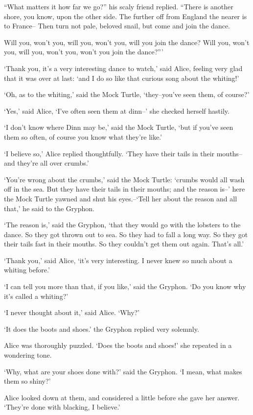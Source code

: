 \documentclass[statementpaper,twoside,openany]{memoir}
\begin{document}
``What matters it how far we go?'' his scaly friend replied. ``There is another shore, you know, upon the other side. The further off from England the nearer is to France-- Then turn not pale, beloved snail, but come and join the dance.

Will you, won't you, will you, won't you, will you join the dance? Will you, won't you, will you, won't you, won't you join the dance?'''

`Thank you, it's a very interesting dance to watch,' said Alice, feeling very glad that it was over at last: `and I do so like that curious song about the whiting!'

`Oh, as to the whiting,' said the Mock Turtle, `they--you've seen them, of course?'

`Yes,' said Alice, `I've often seen them at dinn--' she checked herself hastily.

`I don't know where Dinn may be,' said the Mock Turtle, `but if you've seen them so often, of course you know what they're like.'

`I believe so,' Alice replied thoughtfully. `They have their tails in their mouths--and they're all over crumbs.'

`You're wrong about the crumbs,' said the Mock Turtle: `crumbs would all wash off in the sea. But they have their tails in their mouths; and the reason is--' here the Mock Turtle yawned and shut his eyes.--`Tell her about the reason and all that,' he said to the Gryphon.

`The reason is,' said the Gryphon, `that they would go with the lobsters to the dance. So they got thrown out to sea. So they had to fall a long way. So they got their tails fast in their mouths. So they couldn't get them out again. That's all.'

`Thank you,' said Alice, `it's very interesting. I never knew so much about a whiting before.'

`I can tell you more than that, if you like,' said the Gryphon. `Do you know why it's called a whiting?'

`I never thought about it,' said Alice. `Why?'

`It does the boots and shoes.' the Gryphon replied very solemnly.

Alice was thoroughly puzzled. `Does the boots and shoes!' she repeated in a wondering tone.

`Why, what are your shoes done with?' said the Gryphon. `I mean, what makes them so shiny?'

Alice looked down at them, and considered a little before she gave her answer. `They're done with blacking, I believe.'
\end{document}
